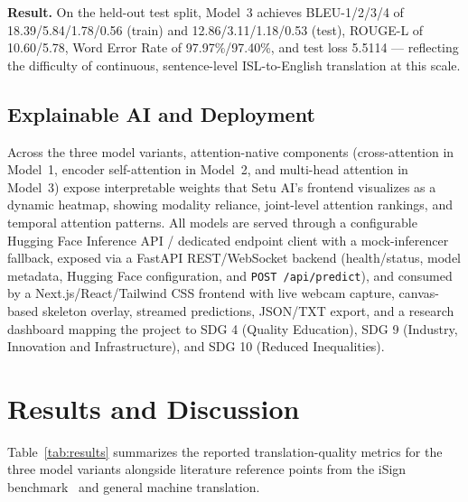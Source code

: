 \documentclass[pdflatex,sn-mathphys-num]{sn-jnl}
\begin{document}
\textbf{Result.} On the held-out test split, Model~3 achieves BLEU-1/2/3/4 of 18.39/5.84/1.78/0.56 (train) and 12.86/3.11/1.18/0.53 (test), ROUGE-L of 10.60/5.78, Word Error Rate of 97.97\%/97.40\%, and test loss 5.5114 — reflecting the difficulty of continuous, sentence-level ISL-to-English translation at this scale.

\subsection{Explainable AI and Deployment}
Across the three model variants, attention-native components (cross-attention in Model~1, encoder self-attention in Model~2, and multi-head attention in Model~3) expose interpretable weights that Setu AI's frontend visualizes as a dynamic heatmap, showing modality reliance, joint-level attention rankings, and temporal attention patterns. All models are served through a configurable Hugging Face Inference API / dedicated endpoint client with a mock-inferencer fallback, exposed via a FastAPI REST/WebSocket backend (health/status, model metadata, Hugging Face configuration, and \texttt{POST /api/predict}), and consumed by a Next.js/React/Tailwind CSS frontend with live webcam capture, canvas-based skeleton overlay, streamed predictions, JSON/TXT export, and a research dashboard mapping the project to SDG 4 (Quality Education), SDG 9 (Industry, Innovation and Infrastructure), and SDG 10 (Reduced Inequalities).

\section{Results and Discussion}\label{sec:results}

Table~\ref{tab:results} summarizes the reported translation-quality metrics for the three model variants alongside literature reference points from the iSign benchmark~\cite{isign} and general machine translation.
\end{document}
